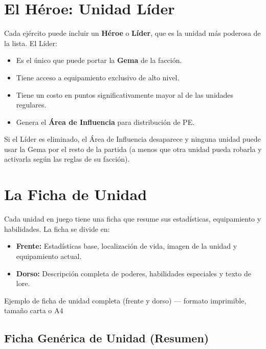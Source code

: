 \section{El Héroe: Unidad Líder}

Cada ejército puede incluir un \textbf{Héroe} o \textbf{Líder}, que es la unidad más poderosa de la lista. El Líder:

\begin{itemize}
    \item Es el único que puede portar la \textbf{Gema} de la facción.
    \item Tiene acceso a equipamiento exclusivo de alto nivel.
    \item Tiene un costo en puntos significativamente mayor al de las unidades regulares.
    \item Genera el \textbf{Área de Influencia} para distribución de PE.
\end{itemize}

\begin{tcolorbox}[colback=GoldRule!10, colframe=GoldRule, title=\textbf{REGLA: Elegido / Líder}]
Si el Líder es eliminado, el Área de Influencia desaparece y ninguna unidad puede usar la Gema por el resto de la partida (a menos que otra unidad pueda robarla y activarla según las reglas de su facción).
\end{tcolorbox}

\section{La Ficha de Unidad}

Cada unidad en juego tiene una ficha que resume sus estadísticas, equipamiento y habilidades. La ficha se divide en:

\begin{itemize}
    \item \textbf{Frente:} Estadísticas base, localización de vida, imagen de la unidad y equipamiento actual.
    \item \textbf{Dorso:} Descripción completa de poderes, habilidades especiales y texto de lore.
\end{itemize}

\begin{imagebox}{Ejemplo de ficha de unidad completa (frente y dorso) — formato imprimible, tamaño carta o A4}
    \vspace{4cm}
\end{imagebox}

\subsection*{Ficha Genérica de Unidad (Resumen)}

